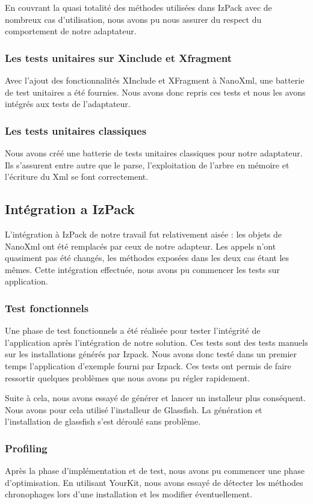 En couvrant la quasi totalité des méthodes utilisées dans IzPack avec de nombreux cas d'utilisation, nous avons pu nous assurer du respect du comportement de notre adaptateur.
\subsubsection{Les tests unitaires sur Xinclude et Xfragment}
Avec l'ajout des fonctionnalités XInclude et XFragment à NanoXml, une batterie de test unitaires a été fournies.
Nous avons donc repris ces tests et nous les avons intégrés aux tests de l'adaptateur.
\subsubsection{Les tests unitaires classiques}
Nous avons créé une batterie de tests unitaires classiques pour notre adaptateur.
Ils s'assurent entre autre que le parse, l'exploitation de l'arbre en mémoire et l'écriture du Xml se font correctement.
\subsection{Intégration a IzPack}
L'intégration à IzPack de notre travail fut relativement aisée : les objets de NanoXml ont été remplacés par ceux de notre adapteur.
Les appels n'ont quasiment pas été changés, les méthodes exposées dans les deux cas étant les mêmes.
Cette intégration effectuée, nous avons pu commencer les tests sur application.
\subsubsection{Test fonctionnels}
Une phase de test fonctionnels a été réalisée pour tester l'intégrité de l'application après l'intégration de notre solution.
Ces tests sont des tests manuels sur les installations générés par Izpack.
Nous avons donc testé dans un premier temps l'application d'exemple fourni par Izpack.
Ces tests ont permis de faire ressortir quelques problèmes que nous avons pu régler rapidement.

Suite à cela, nous avons essayé de générer et lancer un installeur plus conséquent.
Nous avons pour cela utilisé l'installeur de Glassfish.
La génération et l'installation de glassfish s'est déroulé sans problème.
\subsubsection{Profiling}
Après la phase d'implémentation et de test, nous avons pu commencer une phase d'optimisation.
En utilisant YourKit, nous avons essayé de détecter les méthodes chronophages lors d'une installation et les modifier éventuellement.

